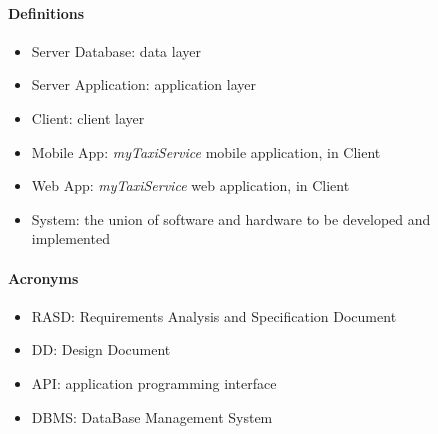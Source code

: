 \paragraph{Definitions}
\begin{itemize}
	\item Server Database: data layer
	\item Server Application: application layer
	\item Client: client layer
	\item Mobile App: \textit{myTaxiService} mobile application, in Client
	\item Web App: \textit{myTaxiService} web application, in Client
	\item System: the union of software and hardware to be developed and implemented
\end{itemize}
\paragraph{Acronyms}
\begin{itemize}
	\item RASD: Requirements Analysis and Specification Document
	\item DD: Design Document
	\item API: application programming interface
	\item DBMS: DataBase Management System
\end{itemize}